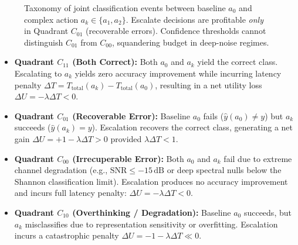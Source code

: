 \begin{figure}[t]
{%
}
\caption{Taxonomy of joint classification events between baseline $a_0$ and complex action $a_k \in \{a_1, a_2\}$. Escalate decisions are profitable \emph{only} in Quadrant $C_{01}$ (recoverable errors). Confidence thresholds cannot distinguish $C_{01}$ from $C_{00}$, squandering budget in deep-noise regimes.}
\label{fig:recoverability_quadrants}
\end{figure}

\begin{itemize}
    \item \textbf{Quadrant $C_{11}$ (Both Correct):} Both $a_0$ and $a_k$ yield the correct class. Escalating to $a_k$ yields zero accuracy improvement while incurring latency penalty $\Delta T = T_{\mathrm{total}}(a_k) - T_{\mathrm{total}}(a_0)$, resulting in a net utility loss $\Delta U = -\lambda \Delta T < 0$.
    
    \item \textbf{Quadrant $C_{01}$ (Recoverable Error):} Baseline $a_0$ fails ($\hat{y}(a_0) \neq y$) but $a_k$ succeeds ($\hat{y}(a_k) = y$). Escalation recovers the correct class, generating a net gain $\Delta U = +1 - \lambda \Delta T > 0$ provided $\lambda \Delta T < 1$.
    
    \item \textbf{Quadrant $C_{00}$ (Irrecuperable Error):} Both $a_0$ and $a_k$ fail due to extreme channel degradation (e.g., $\mathrm{SNR} \le -15\,\mathrm{dB}$ or deep spectral nulls below the Shannon classification limit). Escalation produces no accuracy improvement and incurs full latency penalty: $\Delta U = -\lambda \Delta T < 0$.
    
    \item \textbf{Quadrant $C_{10}$ (Overthinking / Degradation):} Baseline $a_0$ succeeds, but $a_k$ misclassifies due to representation sensitivity or overfitting. Escalation incurs a catastrophic penalty $\Delta U = -1 - \lambda \Delta T \ll 0$.
\end{itemize}

